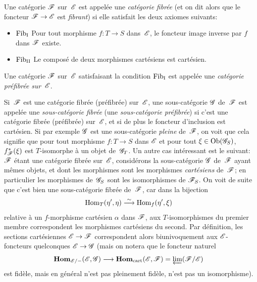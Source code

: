 \begin{definition}
\label{VI.6.1}
Une cat\'egorie $\cal{F}$ sur~$\cal{E}$ est appel\'ee une
\emph{catégorie fibrée}
(et on dit alors que le foncteur $\cal{F}\to\cal{E}$ est
\emph{fibrant})
si elle satisfait les deux axiomes suivants:
\begin{itemize}
\item{$\mathrm{Fib}_\mathrm{I}$}
Pour tout morphisme $f\colon T\to S$ dans~$\cal{E}$, le foncteur image
inverse par $f$ dans $\cal{F}$ existe.
\item{$\mathrm{Fib}_\mathrm{II}$} Le compos\'e de deux morphismes cart\'esiens
est cart\'esien.
\end{itemize}
Une cat\'egorie $\cal{F}$ sur~$\cal{E}$ satisfaisant la condition
$\mathrm{Fib}_\mathrm{I}$ est appel\'ee une \emph{catégorie
préfibrée sur~$\cal{E}$}.
\end{definition}

Si~$\cal{F}$ est une cat\'egorie fibr\'ee
(\resp pr\'efibr\'ee) sur~$\cal{E}$, une sous-cat\'egorie
$\cal{G}$ de~$\cal{F}$ est appel\'ee une \emph{sous-catégorie
fibrée}
(\resp une \emph{sous-catégorie préfibrée}) si c'est une
cat\'egorie fibr\'ee (\resp pr\'efibr\'ee) sur~$\cal{E}$, et
si de plus le foncteur d'inclusion est cart\'esien. Si par exemple
$\cal{G}$ est une sous-cat\'egorie \emph{pleine} de~$\cal{F}$, on
voit que cela signifie que pour tout morphisme $f\colon T\to S$ dans
$\cal{E}$ et pour tout $\xi \in \Ob(\cal{G}_S)$, $f^*_{\cal{F}}(\xi)$
est $T$-isomorphe \`a un objet de~$\cal{G}_T$. Un autre cas
int\'eressant est le suivant: $\cal{F}$ \'etant une cat\'egorie
fibr\'ee sur~$\cal{E}$, consid\'erons la sous-cat\'egorie
$\cal{G}$ de~$\cal{F}$ ayant m\^emes objets, et dont les morphismes
sont les morphismes \emph{cartésiens} de~$\cal{F}$; en particulier
les morphismes de~$\cal{G}_S$ sont les isomorphismes de
$\cal{F}_S$. On voit de suite que c'est bien une sous-cat\'egorie
fibr\'ee de~$\cal{F}$, car dans la bijection
$$
\operatorname{Hom}_T(\eta',\eta) \overset{\sim}{\longrightarrow} \operatorname{Hom}_f(\eta',\xi)
$$
relative \`a un $f$-morphisme cart\'esien $\alpha$ dans $\cal{F}$,
aux $T$-isomorphismes du premier membre correspondent les morphismes
cart\'esiens du second. Par d\'efinition, les sections
cart\'esiennes $\cal{E}\to\cal{F}$
correspondent
alors biunivoquement aux $\cal{E}$-foncteurs quelconques
$\cal{E}\to\cal{G}$ (mais on notera que le foncteur naturel
$$
\SheafHom_{\cal{E}/-}(\cal{E},\cal{G})\to
\SheafHom_\cart(\cal{E},\cal{F})=
\varprojLim(\cal{F}/\cal{E})
$$
est fid\`ele, mais en g\'en\'eral n'est pas pleinement
fid\`ele, \ie n'est pas un isomorphisme).

